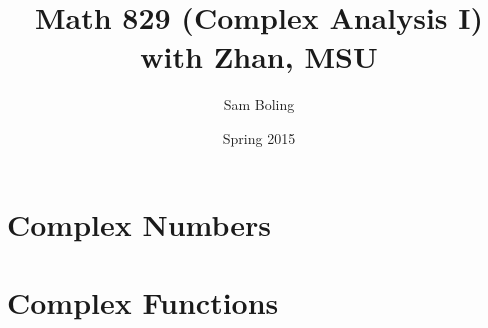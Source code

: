 \documentclass{report}
\title{Math 829 (Complex Analysis I) with Zhan, MSU}
\author{Sam Boling}
\date{Spring 2015}
\begin{document}
\maketitle

\chapter{Complex Numbers}



\chapter{Complex Functions}





\end{document}
